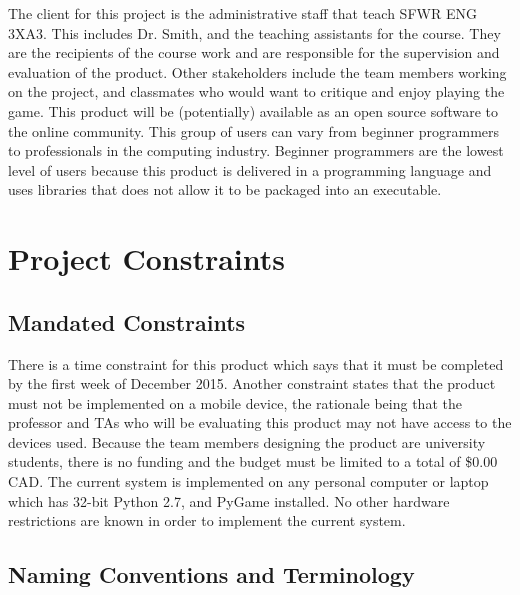 \documentclass[12pt]{article}
\begin{document}
The client for this project is the administrative staff that teach SFWR ENG 3XA3. This includes Dr. Smith, and the teaching assistants for the course. They are the recipients of the course work and are responsible for the supervision and evaluation of the product. Other stakeholders include the team members working on the project, and classmates who would want to critique and enjoy playing the game. This product will be (potentially) available as an open source software to the online community. This group of users can vary from beginner programmers to professionals in the computing industry. Beginner programmers are the lowest level of users because this product is delivered in a programming language and uses libraries that does not allow it to be packaged into an executable.

\section*{Project Constraints}

\subsection{Mandated Constraints}

There is a time constraint for this product which says that it must be completed by the first week of December 2015. Another constraint states that the product must not be implemented on a mobile device, the rationale being that the professor and TAs who will be evaluating this product may not have access to the devices used. Because the team members designing the product are university students, there is no funding and the budget must be limited to a total of \$0.00 CAD. The current system is implemented on any personal computer or laptop which has 32-bit Python 2.7, and PyGame installed. No other hardware restrictions are known in order to implement the current system.

\subsection{Naming Conventions and Terminology}
\end{document}
